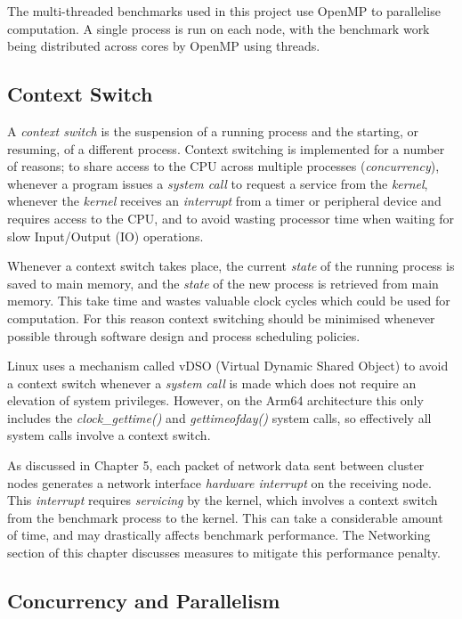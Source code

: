 The multi-threaded benchmarks used in this project use OpenMP to parallelise computation. A single process is run on each node, with the benchmark work being distributed across cores by OpenMP using threads. 


\subsection{Context Switch}

A \emph{context switch} is the suspension of a running process and the starting, or resuming, of a different process. Context switching is implemented for a number of reasons; to share access to the CPU across multiple processes (\emph{concurrency}), whenever a program issues a \emph{system call} to request a service from the \emph{kernel}, whenever the \emph{kernel} receives an \emph{interrupt} from a timer or peripheral device and requires access to the CPU, and to avoid wasting processor time when waiting for slow Input/Output (IO) operations.

Whenever a context switch takes place, the current \emph{state} of the running process is saved to main memory, and the \emph{state} of the new process is retrieved from main memory. This take time and wastes valuable clock cycles which could be used for computation. For this reason context switching should be minimised whenever possible through software design and process scheduling policies.

Linux uses a mechanism called vDSO (Virtual Dynamic Shared Object) to avoid a context switch whenever a \emph{system call} is made which does not require an elevation of system privileges. However, on the Arm64 architecture this only includes the \emph{clock\_gettime()} and \emph{gettimeofday()} system calls, so effectively all system calls involve a context switch.

As discussed in Chapter 5, each packet of network data sent between cluster nodes generates a network interface \emph{hardware interrupt} on the receiving node. This \emph{interrupt} requires \emph{servicing} by the kernel, which involves a context switch from the benchmark process to the kernel. This can take a considerable amount of time, and may drastically affects benchmark performance. The Networking section of this chapter discusses measures to mitigate this performance penalty.

\subsection{Concurrency and Parallelism}


